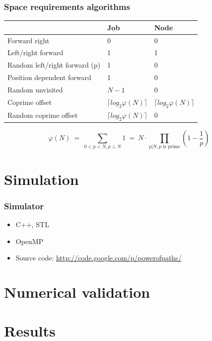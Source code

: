 \documentclass[compress]{beamer}
\begin{document}
\begin{frame}
\frametitle{Space requirements algorithms}
\begin{table}[h!]
\centering
\begin{tabular}{|p{}|p{}|p{}|} \cline{2-3}
\multicolumn{1}{l|}{}		& Job				& Node \\ \hline
Forward right			& 0				& 0		\\ \hline
Left/right forward		& 1				& 1		\\ \hline
Random left/right forward (p)	& 1				& 0		\\ \hline
Position dependent forward	& 1				& 0		\\ \hline
Random unvisited		& $N-1$				& 0		\\ \hline
Coprime offset			& $\lceil log_2 \varphi(N) \rceil$	& $\lceil log_2 \varphi(N) \rceil$ \\ \hline
Random coprime offset		& $\lceil log_2 \varphi(N) \rceil$	& 0		\\ \hline
\end{tabular}
\end{table}

\[
\varphi(N) ~=~ \sum_{0 < p < N, p \perp N} 1 ~=~  N \cdot \prod_{p|N, p\text{ is prime}} (1-\frac{1}{p})
\]

\end{frame}

\section{Simulation}
\begin{frame}
\frametitle{Simulator}
\begin{itemize}
 \item C++, STL
 \item OpenMP
 \item Source code: \url{http://code.google.com/p/powerofpaths/}
\end{itemize}
\end{frame}


\section{Numerical validation}

\section{Results}
\end{document}
